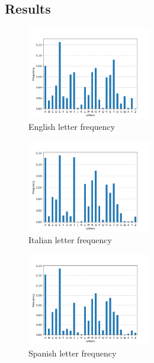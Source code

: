 \documentclass{article}
\begin{document}
\begin{multicols}{2}
\section{Results}
\begin{figure}[H]
    \centering
    \includegraphics[width=0.48\textwidth]{figures/en.png}
    \caption{English letter frequency}
    \label{fig:en_freq}
\end{figure}
\begin{figure}[H]
    \centering
    \includegraphics[width=0.48\textwidth]{figures/it.png}
    \caption{Italian letter frequency}
    \label{fig:it_freq}
\end{figure}
\begin{figure}[H]
    \centering
    \includegraphics[width=0.48\textwidth]{figures/es.png}
    \caption{Spanish letter frequency}
    \label{fig:es_freq}
\end{figure}


\end{multicols}
\end{document}
